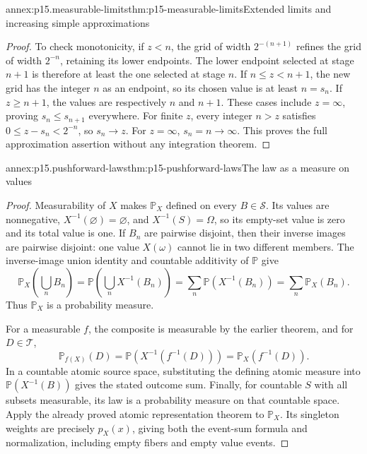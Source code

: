 \begin{annexitem}{annex:p15.measurable-limits}{thm:p15-measurable-limits}{Extended limits and increasing simple approximations}
\begin{proof}
To check monotonicity, if \(z<n\), the grid of width \(2^{-(n+1)}\)
refines the grid of width \(2^{-n}\), retaining its lower endpoints.
The lower endpoint selected at stage \(n+1\) is therefore at least
the one selected at stage \(n\). If \(n\leq z<n+1\), the new grid
has the integer \(n\) as an endpoint, so its chosen value is at least
\(n=s_n\). If \(z\geq n+1\), the values are respectively \(n\)
and \(n+1\). These cases include \(z=\infty\), proving
\(s_n\leq s_{n+1}\) everywhere. For finite \(z\), every integer
\(n>z\) satisfies \(0\leq z-s_n<2^{-n}\), so \(s_n\to z\).
For \(z=\infty\), \(s_n=n\to\infty\). This proves the full
approximation assertion without any integration theorem.
\end{proof}
\end{annexitem}

\begin{annexitem}{annex:p15.pushforward-laws}{thm:p15-pushforward-laws}{The law as a measure on values}
\begin{proof}
Measurability of \(X\) makes \(\mathbb P_X\) defined on every
\(B\in\mathcal S\). Its values are nonnegative,
\(X^{-1}(\varnothing)=\varnothing\), and \(X^{-1}(S)=\Omega\),
so its empty-set value is zero and its total value is one. If \(B_n\)
are pairwise disjoint, then their inverse images are pairwise disjoint:
one value \(X(\omega)\) cannot lie in two different members. The
inverse-image union identity and countable additivity of \(\mathbb P\)
give
\[
 \mathbb P_X\left(\bigcup_n B_n\right)
   =\mathbb P\left(\bigcup_n X^{-1}(B_n)\right)
   =\sum_n\mathbb P(X^{-1}(B_n))=\sum_n\mathbb P_X(B_n).
\]
Thus \(\mathbb P_X\) is a probability measure.

For a measurable \(f\), the composite is measurable by the earlier
theorem, and for \(D\in\mathcal T\),
\[
 \mathbb P_{f(X)}(D)
   =\mathbb P(X^{-1}(f^{-1}(D)))=\mathbb P_X(f^{-1}(D)).
\]
In a countable atomic source space, substituting the defining atomic
measure into \(\mathbb P(X^{-1}(B))\) gives the stated outcome sum.
Finally, for countable \(S\) with all subsets measurable, its law is
a probability measure on that countable space. Apply the already proved
atomic representation theorem to \(\mathbb P_X\). Its singleton
weights are precisely \(p_X(x)\), giving both the event-sum formula
and normalization, including empty fibers and empty value events.
\end{proof}
\end{annexitem}

